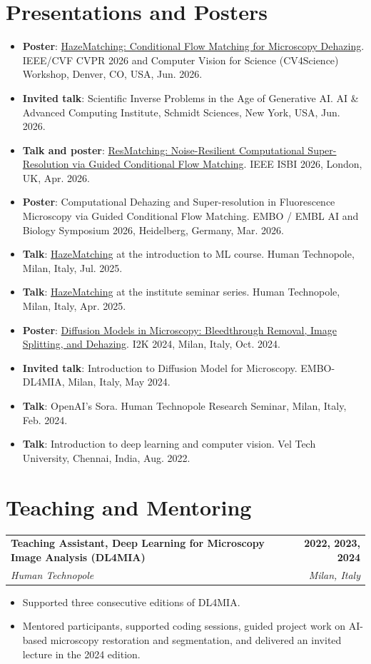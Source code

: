 \documentclass[11pt,a4paper]{article}
\makeatletter
\newcommand{\entry}[4]{%
  \begin{tabularx}{\linewidth}{@{}>{\raggedright\arraybackslash}X r@{}}
    \textbf{#1} & \textbf{#2} \\
    \textit{#3} & \textit{#4}
  \end{tabularx}\vspace{-2pt}
}
\makeatother
\begin{document}
\section*{Presentations and Posters}
\begin{itemize}
  \item \textbf{Poster}: \href{https://arxiv.org/abs/2506.22397}{HazeMatching: Conditional Flow Matching for Microscopy Dehazing}. IEEE/CVF CVPR 2026 and Computer Vision for Science (CV4Science) Workshop, Denver, CO, USA, Jun. 2026.
  \item \textbf{Invited talk}: Scientific Inverse Problems in the Age of Generative AI. AI \& Advanced Computing Institute, Schmidt Sciences, New York, USA, Jun. 2026.
  \item \textbf{Talk and poster}: \href{https://rayanirban.github.io/resmatching/}{ResMatching: Noise-Resilient Computational Super-Resolution via Guided Conditional Flow Matching}. IEEE ISBI 2026, London, UK, Apr. 2026.
  \item \textbf{Poster}: Computational Dehazing and Super-resolution in Fluorescence Microscopy via Guided Conditional Flow Matching. EMBO / EMBL AI and Biology Symposium 2026, Heidelberg, Germany, Mar. 2026.
  \item \textbf{Talk}: \href{https://arxiv.org/abs/2506.22397}{HazeMatching} at the introduction to ML course. Human Technopole, Milan, Italy, Jul. 2025.
  \item \textbf{Talk}: \href{https://arxiv.org/abs/2506.22397}{HazeMatching} at the institute seminar series. Human Technopole, Milan, Italy, Apr. 2025.
  \item \textbf{Poster}: \href{https://events.humantechnopole.it/event/1/contributions/81/}{Diffusion Models in Microscopy: Bleedthrough Removal, Image Splitting, and Dehazing}. I2K 2024, Milan, Italy, Oct. 2024.
  \item \textbf{Invited talk}: Introduction to Diffusion Model for Microscopy. EMBO-DL4MIA, Milan, Italy, May 2024.
  \item \textbf{Talk}: OpenAI's Sora. Human Technopole Research Seminar, Milan, Italy, Feb. 2024.
  \item \textbf{Talk}: Introduction to deep learning and computer vision. Vel Tech University, Chennai, India, Aug. 2022.
\end{itemize}

\section*{Teaching and Mentoring}
\entry{Teaching Assistant, Deep Learning for Microscopy Image Analysis (DL4MIA)}{2022, 2023, 2024}{Human Technopole}{Milan, Italy}
\begin{itemize}
  \item Supported three consecutive editions of DL4MIA.
  \item Mentored participants, supported coding sessions, guided project work on AI-based microscopy restoration and segmentation, and delivered an invited lecture in the 2024 edition.
\end{itemize}
\end{document}
